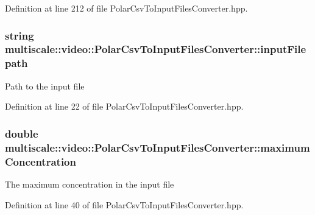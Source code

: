 \-Definition at line 212 of file \-Polar\-Csv\-To\-Input\-Files\-Converter.\-hpp.

\hypertarget{classmultiscale_1_1video_1_1PolarCsvToInputFilesConverter_a7b33b6d00b5e0d809f4fb0d76985ab59}{
\subsubsection[{input\-Filepath}]{\setlength{\rightskip}{0pt plus 5cm}string {\bf multiscale\-::video\-::\-Polar\-Csv\-To\-Input\-Files\-Converter\-::input\-Filepath}}}\label{classmultiscale_1_1video_1_1PolarCsvToInputFilesConverter_a7b33b6d00b5e0d809f4fb0d76985ab59}
\-Path to the input file 

\-Definition at line 22 of file \-Polar\-Csv\-To\-Input\-Files\-Converter.\-hpp.

\hypertarget{classmultiscale_1_1video_1_1PolarCsvToInputFilesConverter_a89b7dce2825cd5c8c45a1e6f19770e5f}{
\subsubsection[{maximum\-Concentration}]{\setlength{\rightskip}{0pt plus 5cm}double {\bf multiscale\-::video\-::\-Polar\-Csv\-To\-Input\-Files\-Converter\-::maximum\-Concentration}}}\label{classmultiscale_1_1video_1_1PolarCsvToInputFilesConverter_a89b7dce2825cd5c8c45a1e6f19770e5f}
\-The maximum concentration in the input file 

\-Definition at line 40 of file \-Polar\-Csv\-To\-Input\-Files\-Converter.\-hpp.

